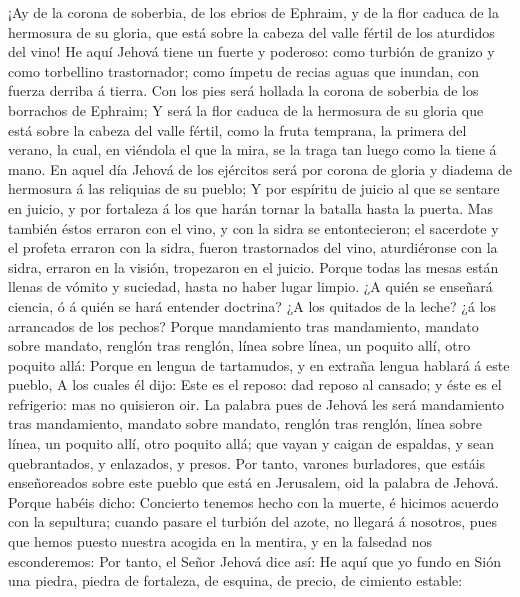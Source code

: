  ¡Ay de la corona de soberbia, de los ebrios de Ephraim, y
de la flor caduca de la hermosura de su gloria, que está sobre la cabeza
del valle fértil de los aturdidos del vino!  He aquí
Jehová tiene un fuerte y poderoso: como turbión de granizo y como
torbellino trastornador; como ímpetu de recias aguas que inundan, con
fuerza derriba á tierra.  Con los pies será hollada la
corona de soberbia de los borrachos de Ephraim;  Y será la
flor caduca de la hermosura de su gloria que está sobre la cabeza del
valle fértil, como la fruta temprana, la primera del verano, la cual, en
viéndola el que la mira, se la traga tan luego como la tiene á mano.
 En aquel día Jehová de los ejércitos será por corona de
gloria y diadema de hermosura á las reliquias de su pueblo;
 Y por espíritu de juicio al que se sentare en juicio, y
por fortaleza á los que harán tornar la batalla hasta la puerta.
 Mas también éstos erraron con el vino, y con la sidra se
entontecieron; el sacerdote y el profeta erraron con la sidra, fueron
trastornados del vino, aturdiéronse con la sidra, erraron en la visión,
tropezaron en el juicio.  Porque todas las mesas están
llenas de vómito y suciedad, hasta no haber lugar limpio. 
¿A quién se enseñará ciencia, ó á quién se hará entender doctrina? ¿A
los quitados de la leche? ¿á los arrancados de los pechos?
 Porque mandamiento tras mandamiento, mandato sobre
mandato, renglón tras renglón, línea sobre línea, un poquito allí, otro
poquito allá:  Porque en lengua de tartamudos, y en
extraña lengua hablará á este pueblo,  A los cuales él
dijo: Este es el reposo: dad reposo al cansado; y éste es el refrigerio:
mas no quisieron oir.  La palabra pues de Jehová les será
mandamiento tras mandamiento, mandato sobre mandato, renglón tras
renglón, línea sobre línea, un poquito allí, otro poquito allá; que
vayan y caigan de espaldas, y sean quebrantados, y enlazados, y presos.
 Por tanto, varones burladores, que estáis enseñoreados
sobre este pueblo que está en Jerusalem, oid la palabra de Jehová.
 Porque habéis dicho: Concierto tenemos hecho con la
muerte, é hicimos acuerdo con la sepultura; cuando pasare el turbión del
azote, no llegará á nosotros, pues que hemos puesto nuestra acogida en
la mentira, y en la falsedad nos esconderemos:  Por
tanto, el Señor Jehová dice así: He aquí que yo fundo en Sión una
piedra, piedra de fortaleza, de esquina, de precio, de cimiento estable:
